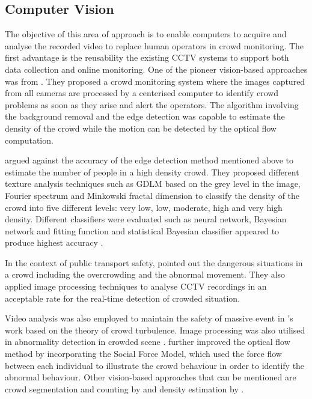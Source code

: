 \subsection{Computer Vision}
The objective of this area of approach is to enable computers to acquire and analyse the recorded video to replace human operators in crowd monitoring. The first advantage is the reusability the existing CCTV systems to support both data collection and online monitoring. One of the pioneer vision-based approaches was from \citet{Davies1995}. They proposed a crowd monitoring system where the images captured from all cameras are processed by a centerised computer to identify crowd problems as soon as they arise and alert the operators. The algorithm involving the background removal and the edge detection was capable to estimate the density of the crowd while the motion can be detected by the optical flow computation.

\citet{Marana1997} argued against the accuracy of the edge detection method mentioned above to estimate the number of people in a high density crowd. They proposed different texture analysis techniques such as GDLM based on the grey level in the image, Fourier spectrum and Minkowski fractal dimension \citep{Marana1999} to classify the density of the crowd into five different levels: very low, low, moderate, high and very high density. Different classifiers were evaluated such as neural network, Bayesian network and fitting function and statistical Bayesian classifier appeared to produce highest accuracy \citep{Marana1998}.

In the context of public transport safety, \citet{Velastin1999} pointed out the dangerous situations in a crowd including the overcrowding and the abnormal movement. They also applied image processing techniques to analyse CCTV recordings in an acceptable rate for the real-time detection of crowded situation.

Video analysis was also employed to maintain the safety of massive event in \citet{Johansson2008}’s work based on the theory of crowd turbulence. Image processing was also utilised in abnormality detection in crowded scene \citep{Mahadevan2010, Mehran2009}. \citet{Mehran2009} further improved the optical flow method by incorporating the Social Force Model, which used the force flow between each individual to illustrate the crowd behaviour in order to identify the abnormal behaviour. Other vision-based approaches that can be mentioned are crowd segmentation and counting by \citet{Chan2008} and density estimation by \citet{Li2010}.

